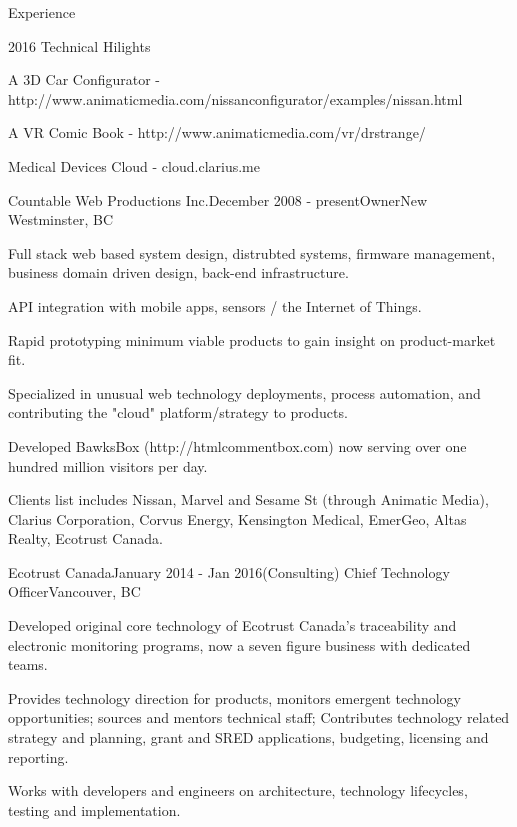 \documentclass{resume} %
\begin{document}

\begin{rSection}{Experience}

\begin{rSubsection}{2016 Technical Hilights}{}{}{}
\item A 3D Car Configurator - http://www.animaticmedia.com/nissanconfigurator/examples/nissan.html
\item A VR Comic Book - http://www.animaticmedia.com/vr/drstrange/
\item Medical Devices Cloud - cloud.clarius.me
\end{rSubsection}


\begin{rSubsection}{Countable Web Productions Inc.}{December 2008 - present}{Owner}{New Westminster, BC}
\item Full stack web based system design, distrubted systems, firmware management, business domain driven design, back-end infrastructure.
\item API integration with mobile apps, sensors / the Internet of Things.
\item Rapid prototyping minimum viable products to gain insight on product-market fit.
\item Specialized in unusual web technology deployments, process automation, and contributing the "cloud" platform/strategy to products.
\item Developed BawksBox (http://htmlcommentbox.com) now serving over one hundred million visitors per day.
\item Clients list includes Nissan, Marvel and Sesame St (through Animatic Media), Clarius Corporation, Corvus Energy, Kensington Medical, EmerGeo, Altas Realty, Ecotrust Canada.
\end{rSubsection}


\begin{rSubsection}{Ecotrust Canada}{January 2014 - Jan 2016}{(Consulting) Chief Technology Officer}{Vancouver, BC}
\item Developed original core technology of Ecotrust Canada's traceability and electronic monitoring programs, now a seven figure business with dedicated teams.
\item Provides technology direction for products, monitors emergent technology opportunities; sources and mentors technical staff; Contributes technology related strategy and planning, grant and SRED applications, budgeting, licensing and reporting.
\item Works with developers and engineers on architecture, technology lifecycles, testing and implementation.
\end{rSubsection}


\end{rSection}
\end{document}

